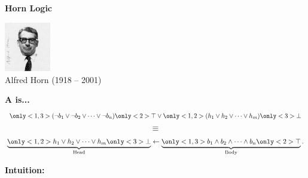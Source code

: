 \documentclass[aspectratio=169]{beamer}
\newenvironment{vhcenterb}{\vspace*{\fill}\begin{center}}{\end{center}\vspace*{\fill}}
\begin{document}
\begin{frame}{\textbf{Horn Logic}}
\begin{vhcenterb}
  \includegraphics[width=2cm]{figures/horn.jpg}\\
  {\scriptsize Alfred Horn (1918 -- 2001)}

  \vspace{0.25cm}
  \textcolor{palette-blue}{\textbf{A \underline{} is...}}
  \vspace{0.1cm}
  \begin{equation*}
    \only<1,3>{(\neg b_1\vee\neg b_2\vee\cdots\vee\neg b_n)}\only<2>{\top}
    \vee \only<1,2>{(h_1\vee h_2\vee\cdots\vee h_m)}\only<3>{\bot}
  \end{equation*}
  \begin{equation*}
                                              \equiv
  \end{equation*}
  \begin{equation*}
    \underbrace{\only<1,2>{h_1\vee h_2\vee\cdots\vee h_m}\only<3>{\bot}}_{\text{Head}}\gets
    \underbrace{\only<1,3>{b_1\wedge b_2\wedge\cdots\wedge b_n}\only<2>{\top}}_{\text{Body}}.
  \end{equation*}
  \vspace*{0.2cm}

  \textcolor{boxdgreen}{\textbf{Intuition:} 
  }
\end{vhcenterb}

\textcolor{dark gray}{\scriptsize\citep{horn51}}
\end{frame}

\end{document}
